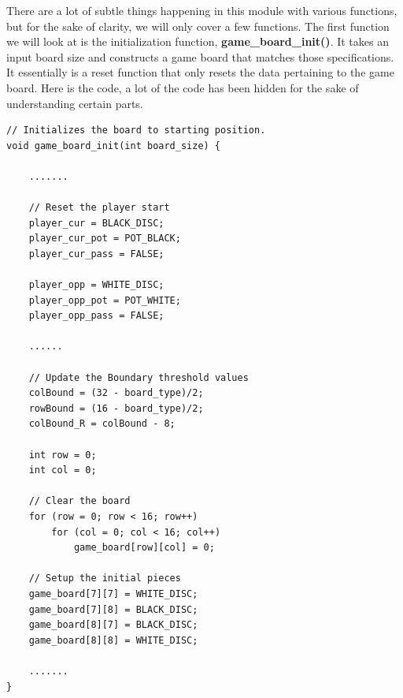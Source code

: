 \documentclass[a4paper, 12pt]{article}
\begin{document}
    There are a lot of subtle things happening in this module with various
    functions, but for the sake of clarity, we will only cover a few
    functions. The first function we will look at is the initialization
    function, \textbf{game\_board\_init()}. It takes an input board size and 
    constructs a game board that matches those specifications. It essentially
    is a reset function that only resets the data pertaining to the game
    board. Here is the code, a lot of the code has been hidden for the sake
    of understanding certain parts.

    \begin{verbatim}
// Initializes the board to starting position.
void game_board_init(int board_size) {
    
    .......

    // Reset the player start
    player_cur = BLACK_DISC;
    player_cur_pot = POT_BLACK;
    player_cur_pass = FALSE;
    
    player_opp = WHITE_DISC;
    player_opp_pot = POT_WHITE;
    player_opp_pass = FALSE;
    
    ......
    
    // Update the Boundary threshold values
    colBound = (32 - board_type)/2;
    rowBound = (16 - board_type)/2;
    colBound_R = colBound - 8;
    
    int row = 0;
    int col = 0;
    
    // Clear the board
    for (row = 0; row < 16; row++)
        for (col = 0; col < 16; col++)
            game_board[row][col] = 0;
    
    // Setup the initial pieces
    game_board[7][7] = WHITE_DISC;
    game_board[7][8] = BLACK_DISC;
    game_board[8][7] = BLACK_DISC;
    game_board[8][8] = WHITE_DISC;

    .......
}
    \end{verbatim}
\end{document}

